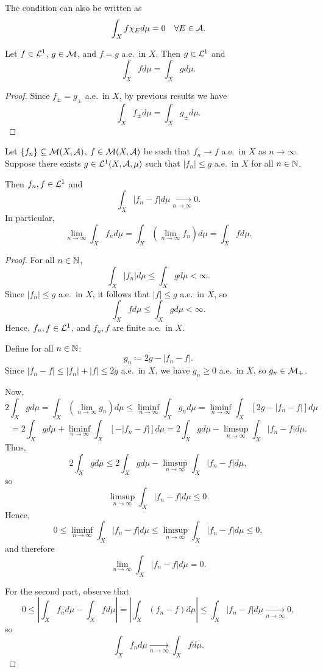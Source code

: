 \begin{remark}
The condition can also be written as
\[
\int_X f \chi_E  d\mu = 0 \quad \forall E \in \mathcal{A}.
\]
\end{remark}

\begin{theorem}
Let $f \in \mathcal{L}^1$, $g \in \mathcal{M}$, and $f = g$ a.e.\ in $X$. Then $g \in \mathcal{L}^1$ and
\[
\int_X f  d\mu = \int_X g  d\mu.
\]
\end{theorem}

\begin{proof}
Since $f_\pm = g_\pm$ a.e.\ in $X$, by previous results we have
\[
\int_X f_\pm  d\mu = \int_X g_\pm  d\mu.
\]
\end{proof}

\clearpage
\begin{theorem}
Let $\{f_n\} \subseteq \mathcal{M}(X, \mathcal{A})$, $f \in \mathcal{M}(X, \mathcal{A})$ be such that $f_n \to f$ a.e.\ in $X$ as $n \to \infty$. Suppose there exists $g \in \mathcal{L}^1(X, \mathcal{A}, \mu)$ such that $|f_n| \leq g$ a.e.\ in $X$ for all $n \in \mathbb{N}$.

Then $f_n, f \in \mathcal{L}^1$ and
\[
\int_X |f_n - f|  d\mu \xrightarrow[n \to \infty]{} 0.
\]
In particular,
\[
\lim_{n \to \infty} \int_X f_n  d\mu = \int_X \left( \lim_{n \to \infty} f_n \right) d\mu = \int_X f  d\mu.
\]
\end{theorem}

\begin{proof}
For all $n \in \mathbb{N}$,
\[
\int_X |f_n|  d\mu \leq \int_X g  d\mu < \infty.
\]
Since $|f_n| \leq g$ a.e.\ in $X$, it follows that $|f| \leq g$ a.e.\ in $X$, so
\[
\int_X f  d\mu \leq \int_X g  d\mu < \infty.
\]
Hence, $f_n, f \in \mathcal{L}^1$, and $f_n, f$ are finite a.e.\ in $X$.

Define for all $n \in \mathbb{N}$:
\[
g_n \coloneqq 2g - |f_n - f|.
\]
Since $|f_n - f| \leq |f_n| + |f| \leq 2g$ a.e.\ in $X$, we have $g_n \geq 0$ a.e.\ in $X$, so $g_n \in \mathcal{M}_+$.

Now,
\[
2 \int_X g  d\mu = \int_X \left( \lim_{n \to \infty} g_n \right) d\mu \leq \liminf_{n \to \infty} \int_X g_n  d\mu = \liminf_{n \to \infty} \int_X [2g - |f_n - f|]  d\mu
\]
\[
= 2 \int_X g  d\mu + \liminf_{n \to \infty} \int_X [-|f_n - f|]  d\mu = 2 \int_X g  d\mu - \limsup_{n \to \infty} \int_X |f_n - f|  d\mu.
\]
Thus,
\[
2 \int_X g  d\mu \leq 2 \int_X g  d\mu - \limsup_{n \to \infty} \int_X |f_n - f|  d\mu,
\]
so
\[
\limsup_{n \to \infty} \int_X |f_n - f|  d\mu \leq 0.
\]
Hence,
\[
0 \leq \liminf_{n \to \infty} \int_X |f_n - f|  d\mu \leq \limsup_{n \to \infty} \int_X |f_n - f|  d\mu \leq 0,
\]
and therefore
\[
\lim_{n \to \infty} \int_X |f_n - f|  d\mu = 0.
\]

For the second part, observe that
\[
0 \leq \left| \int_X f_n  d\mu - \int_X f  d\mu \right| = \left| \int_X (f_n - f)  d\mu \right| \leq \int_X |f_n - f|  d\mu \xrightarrow[n \to \infty]{} 0,
\]
so
\[
\int_X f_n  d\mu \xrightarrow[n \to \infty]{} \int_X f  d\mu.
\]
\end{proof}

